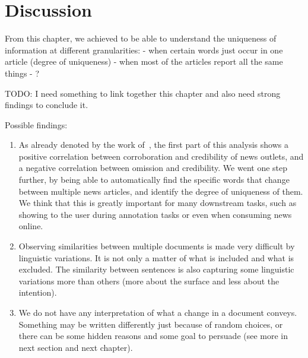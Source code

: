 


\section{Discussion}
\label{sec:cgs_findings}

From this chapter, we achieved to be able to understand the uniqueness of information at different granularities:
- when certain words just occur in one article (degree of uniqueness)
- when most of the articles report all the same things
- ?

TODO: I need something to link together this chapter and also need strong findings to conclude it.


Possible findings:
\begin{enumerate}
    \item As already denoted by the work of~\citet{bountouridis2018explaining}, the first part of this analysis shows a positive correlation between corroboration and credibility of news outlets, and a negative correlation between omission and credibility. We went one step further, by being able to automatically find the specific words that change between multiple news articles, and identify the degree of uniqueness of them. We think that this is greatly important for many downstream tasks, such as showing to the user during annotation tasks or even when consuming news online. %
    \item Observing similarities between multiple documents is made very difficult by linguistic variations. It is not only a matter of what is included and what is excluded. The similarity between sentences is also capturing some linguistic variations more than others (more about the surface and less about the intention).
    \item We do not have any interpretation of what a change in a document conveys. Something may be written differently just because of random choices, or there can be some hidden reasons and some goal to persuade (see more in next section and next chapter).
\end{enumerate}




